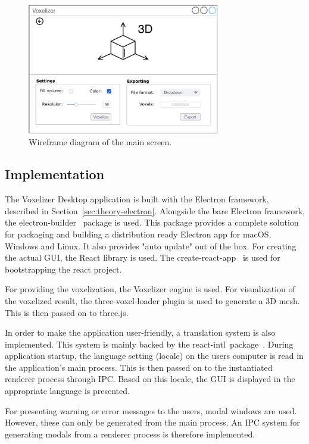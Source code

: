 \begin{figure}[htp]
    \centering
    \includegraphics[width=0.75\textwidth]{sections/methodology/figures/wireframes/wireframe-main-screen.pdf}
    \caption{Wireframe diagram of the main screen.}
    \label{fig:wireframe-main-screen}
\end{figure}

\subsection{Implementation}
The Voxelizer Desktop application is built with the Electron framework, described in Section~\ref{sec:theory-electron}. Alongside the bare Electron framework, the electron-builder~\cite{electron-builder} package is used. This package provides a complete solution for packaging and building a distribution ready Electron app for macOS, Windows and Linux. It also provides "auto update" out of the box. For creating the actual GUI, the React library is used. The create-react-app~\cite{create-react-app} is used for bootstrapping the react project.

For providing the voxelization, the Voxelizer engine is used. For visualization of the voxelized result, the three-voxel-loader plugin is used to generate a 3D mesh. This is then passed on to three.js.

In order to make the application user-friendly, a translation system is also implemented. This system is mainly backed by the react-intl~package~\cite{react-intl}. During application startup, the language setting (locale) on the users computer is read in the application's main process. This is then passed on to the instantiated renderer process through IPC. Based on this locale, the GUI is displayed in the appropriate language is presented.

For presenting warning or error messages to the users, modal windows are used. However, these can only be generated from the main process. An IPC system for generating modals from a renderer process is therefore implemented.

